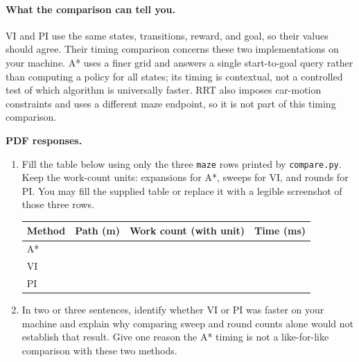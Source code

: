 \documentclass[11pt]{article}
\newenvironment{studentanswer}[1]
  {\par\medskip\noindent
   \begin{tcolorbox}[height from=#1 to 100cm, colback=white, colframe=gray!60,
     boxrule=0.6pt, arc=0pt, outer arc=0pt, left=7pt, right=7pt,
     top=7pt, bottom=7pt, title={Answer / work}, fonttitle=\small,
     coltitle=black, colbacktitle=gray!8, titlerule=0pt]
   \ignorespaces}
  {\end{tcolorbox}\par}
\begin{document}
\clearpage
\paragraph{What the comparison can tell you.}
VI and PI use the same states, transitions, reward, and goal, so their
values should agree. Their timing comparison concerns these two
implementations on your machine. A* uses a finer grid and answers a
single start-to-goal query rather than computing a policy for all states;
its timing is contextual, not a controlled test of which algorithm is
universally faster. RRT also imposes car-motion constraints and uses a
different maze endpoint, so it is not part of this timing comparison.

\textbf{PDF responses.}
\begin{enumerate}[label=(\alph*)]
\item \begin{minipage}[t]{\linewidth}
Fill the table below using only the three \texttt{maze} rows printed by
\texttt{compare.py}. Keep the work-count units: expansions for A*, sweeps
for VI, and rounds for PI. You may fill the supplied table or replace it
with a legible screenshot of those three rows.

\begin{studentanswer}{5cm}
\begin{center}\small
\renewcommand{\arraystretch}{1.7}
\begin{tabular}{l|c|c|c}
Method & Path (m) & Work count (with unit) & Time (ms) \\\hline
A* & & & \\
VI & & & \\
PI & & &
\end{tabular}
\end{center}
\end{studentanswer}

\end{minipage}
\item \begin{minipage}[t]{\linewidth}
In two or three sentences, identify whether VI or PI was faster on your
machine and explain why comparing sweep and round counts alone would
not establish that result. Give one reason the A* timing is not a
like-for-like comparison with these two methods.

\begin{studentanswer}{4cm}
\end{studentanswer}

\end{minipage}
\end{enumerate}
\end{document}
